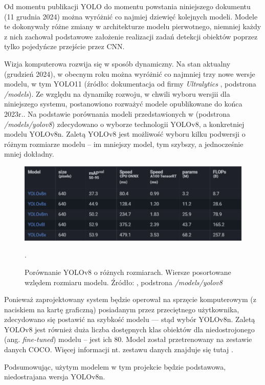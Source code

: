 Od momentu publikacji YOLO do momentu powstania niniejszego dokumentu (11 grudnia 2024) można wyróżnić co najmiej dziewięć kolejnych modeli. Modele te dokonywały różne zmiany w architekturze modelu pierwotnego, niemniej każdy z nich zachował podstawowe założenie realizacji zadań detekcji obiektów poprzez tylko pojedyńcze przejście przez CNN. 

Wizja komputerowa rozwija się w sposób dynamiczny. Na stan aktualny (grudzień 2024), w obecnym roku można wyróżnić co najmniej trzy nowe wersje modelu, w tym YOLO11 \cite{yolo11_ultralytics} (źródło: dokumentacja od firmy \emph{Ultralytics} \cite{yolo_docs}, podstrona \emph{/models}).
Ze względu na dynamikę rozwoju, w chwili wyboru wersjii dla niniejszego systemu, postanowiono rozważyć modele opublikowane do końca 2023r.. Na podstawie porównania modeli przedstawionych w \cite{yolo_docs} (podstrona \emph{/models/yolov8}) zdecydowano o wyborze technologii YOLOv8, a konkretniej modelu YOLOv8n. Zaletą YOLOv8 jest możliwość wyboru kilku podwersji o różnym rozmiarze modelu -- im mniejszy model, tym szybszy, a jednocześnie mniej dokładny.

\begin{figure}[H]
    \centering
    \includegraphics[width=\linewidth]{r_technologie/AI_assets/yolo8_sizes.png}
    \caption{Porównanie YOLOv8 o różnych rozmiarach. Wiersze posortowane wzlędem rozmiaru modelu. Źródło: \cite{yolo_docs}, podstrona \emph{/models/yolov8}}.
    \label{fig:yolo8-sizes}
\end{figure}

Ponieważ zaprojektowany system będzie operował na sprzęcie komputerowym (z naciskiem na kartę graficzną) posiadanym przez przeciętnego użytkownika, zdecydowano się postawić na szybkość modelu --- stąd wybór YOLOv8n. Zaletą YOLOv8 jest również duża liczba dostępnych klas obiektów dla niedostrojonego (ang. \emph{fine-tuned}) modelu -- jest ich 80. Model został przetrenowany na zestawie danych COCO. Więcej informacji nt. zestawu danych znajduje się tutaj \cite{COCO_docs}.

Podsumowując, użytym modelem w tym projekcie będzie podstawowa, niedostrajana wersja YOLOv8n. 



